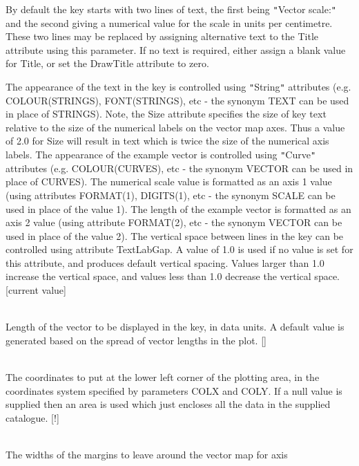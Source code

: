 \documentclass[twoside,11pt]{article}
\renewcommand{\_}{\texttt{\symbol{95}}}
\newcommand{\sstsubsection}[1]{ \item[{#1}] \mbox{} \\}
\newcommand{\sstsubsection}[1]{\item[{#1}]}
\begin{document}
{{{         By default the key starts with two lines of text, the first
         being {\tt "}Vector scale:{\tt "} and the second giving a numerical value
         for the scale in units per centimetre. These two lines may be
         replaced by assigning alternative text to the Title attribute
         using this parameter. If no text is required, either assign a
         blank value for Title, or set the DrawTitle attribute to zero.

         The appearance of the text in the key is controlled using {\tt "}String{\tt "}
         attributes (e.g. COLOUR(STRINGS), FONT(STRINGS), etc - the synonym
         TEXT can be used in place of STRINGS). Note, the Size attribute
         specifies the size of key text relative to the size of the numerical
         labels on the vector map axes. Thus a value of 2.0 for Size will
         result in text which is twice the size of the numerical axis labels.
         The appearance of the example vector is controlled using {\tt "}Curve{\tt "}
         attributes (e.g. COLOUR(CURVES), etc - the synonym VECTOR can be
         used in place of CURVES). The numerical scale value is formatted as
         an axis 1 value (using attributes FORMAT(1), DIGITS(1), etc - the
         synonym SCALE can be used in place of the value 1). The length of
         the example vector is formatted as an axis 2 value (using attribute
         FORMAT(2), etc - the synonym VECTOR can be used in place of the
         value 2). The vertical space between lines in the key can be
         controlled using attribute TextLabGap. A value of 1.0 is used if
         no value is set for this attribute, and produces default vertical
         spacing. Values larger than 1.0 increase the vertical space, and
         values less than 1.0 decrease the vertical space. [current value]
      }
      \sstsubsection{
         KEYVEC = \_REAL (Read)
      }{
         Length of the vector to be displayed in the key, in data units.
         A default value is generated based on the spread of vector
         lengths in the plot. []
      }
      \sstsubsection{
         LBND(2) = \_REAL (Read)
      }{
         The coordinates to put at the lower left corner of the plotting
         area, in the coordinates system specified by parameters COLX and
         COLY. If a null value is supplied then an area is used which just
         encloses all the data in the supplied catalogue. [!]
      }
      \sstsubsection{
         MARGIN( 4 ) = \_REAL (Read)
      }{
         The widths of the margins to leave around the vector map for axis
}}}
\end{document}

